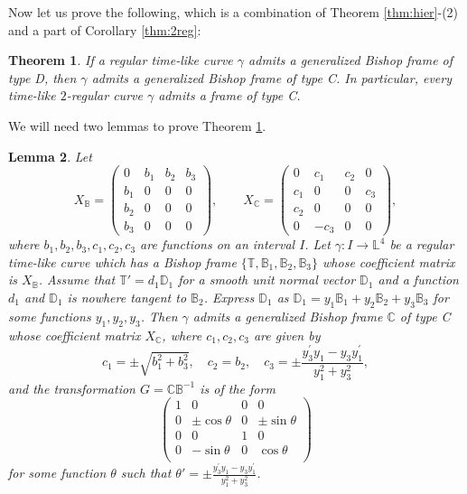 \documentclass[a4paper]{amsart}
\newtheorem{theorem}{Theorem}[section]
\newtheorem{lemma}[theorem]{Lemma}
\theoremstyle{definition}
\theoremstyle{remark}
\newcommand{\BB}{\mathbb{B}}
\newcommand{\CC}{\mathbb{C}}
\newcommand{\DD}{\mathbb{D}}
\newcommand{\TT}{\mathbb{T}}
\newcommand{\LL}{\mathbb{L}}
\numberwithin{equation}{section}
\begin{document}
Now let us prove the following, which is a combination of Theorem \ref{thm:hier}-(2) and a part of Corollary \ref{thm:2reg}:
\begin{theorem}\label{th:DtoC}
If a regular time-like curve $\gamma$ admits a generalized Bishop frame of type D, then $\gamma$ admits a generalized Bishop frame of type C. In particular,
every time-like $2$-regular curve $\gamma$ admits a frame of type C.
\end{theorem}


We will need two lemmas to prove Theorem \ref{th:DtoC}.

\begin{lemma}\label{lem:2}
Let
\begin{equation}\label{eq:BC}
X_{\BB}= \begin{pmatrix}
0&b_{1}&b_{2}&b_{3}\\
b_{1}&0&0&0\\
b_{2}&0&0&0\\
b_{3}&0&0&0
\end{pmatrix}, \quad\quad 
X_{\CC} = \begin{pmatrix}
0&c_{1}&c_{2}&0\\
c_{1}&0&0&c_{3}\\
c_{2}&0&0&0\\
0&-c_{3}&0&0
\end{pmatrix}, 
\end{equation} 
where $b_1, b_2, b_3, c_1, c_2, c_3$ are functions on an interval $I$. Let $\gamma : I \to \LL^{4}$ be a regular time-like curve which has a Bishop frame $\{\TT, \BB_1, \BB_2, \BB_3\}$ whose coefficient matrix is $X_{\BB}$. %
Assume that $\TT' = d_1\DD_1$ for a smooth unit normal vector $\DD_1$ and a function $d_{1}$ and $\DD_1$ is nowhere tangent to $\BB_2$. Express $\DD_1$ as $\DD_1 = y_1 \BB_1 + y_2\BB_2 + y_3\BB_3$ for some functions $y_1, y_2, y_3$. 
Then $\gamma$ admits a generalized Bishop frame $\CC$ of type C whose coefficient matrix $X_{\CC}$, where $c_1,c_2,c_3$ are given by 
\begin{equation}\label{eq:cs}
c_{1}=\pm\sqrt{b_{1}^{2}+b_{3}^{2}}, \quad c_{2}=b_{2}, \quad c_{3}=\pm\frac{y_{3}^{\prime}y_{1}-y_{3}y_{1}^{\prime}}{y_{1}^{2}+y_{3}^{2}},
\end{equation}
and the transformation $G = \CC \BB^{-1}$ is of the form 
\begin{equation}\label{eq:bGbc1}
\left(\begin{matrix}
1&0&0&0\\
0&\pm\cos \theta &0&\pm\sin \theta\\
0&0&1&0\\
0&-\sin \theta&0&\cos \theta\\
\end{matrix}\right)
\end{equation}
for some function $\theta$ such that $\theta'=\pm \frac{y_{3}^{\prime}y_{1}-y_{3}y_{1}^{\prime}}{y_{1}^{2}+y_{3}^{2}}$. 
\end{lemma}
\end{document}
